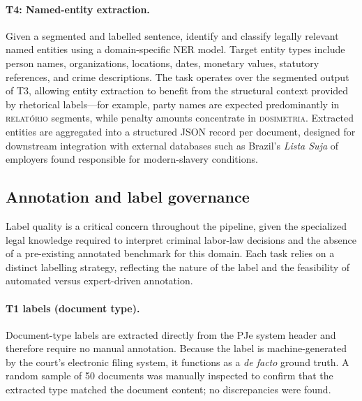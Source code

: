 \documentclass[preprint,a4paper,fleqn]{cas-dc}
\begin{document}
\paragraph{T4: Named-entity extraction.}
Given a segmented and labelled sentence, identify and classify legally relevant named entities using a domain-specific NER model. Target entity types include person names, organizations, locations, dates, monetary values, statutory references, and crime descriptions. The task operates over the segmented output of T3, allowing entity extraction to benefit from the structural context provided by rhetorical labels---for example, party names are expected predominantly in \textsc{relat\'orio} segments, while penalty amounts concentrate in \textsc{dosimetria}. Extracted entities are aggregated into a structured JSON record per document, designed for downstream integration with external databases such as Brazil's \textit{Lista Suja} of employers found responsible for modern-slavery conditions.
\subsection{Annotation and label governance}
\label{subsec:annotation}

Label quality is a critical concern throughout the pipeline, given the specialized legal knowledge required to interpret criminal labor-law decisions and the absence of a pre-existing annotated benchmark for this domain. Each task relies on a distinct labelling strategy, reflecting the nature of the label and the feasibility of automated versus expert-driven annotation.

\paragraph{T1 labels (document type).}
Document-type labels are extracted directly from the PJe system header and therefore require no manual annotation. Because the label is machine-generated by the court's electronic filing system, it functions as a \textit{de facto} ground truth. A random sample of 50 documents was manually inspected to confirm that the extracted type matched the document content; no discrepancies were found.
\end{document}
